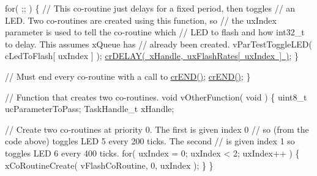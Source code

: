 \begin{DoxyPre}    for( ;; )
    \{
        // This co-routine just delays for a fixed period, then toggles
        // an LED.  Two co-routines are created using this function, so
        // the uxIndex parameter is used to tell the co-routine which
        // LED to flash and how int32\_t to delay.  This assumes xQueue has
        // already been created.
        vParTestToggleLED( cLedToFlash[ uxIndex ] );
        \mbox{\hyperlink{croutine_8h_a05a06feb11028f2d1d440ea335f562ba}{crDELAY( xHandle, uxFlashRates[ uxIndex ] )}};
    \}\end{DoxyPre}



\begin{DoxyPre}    // Must end every co-routine with a call to \mbox{\hyperlink{croutine_8h_ae6038cc976689b50000475ebfc4e2f23}{crEND()}};
    \mbox{\hyperlink{croutine_8h_ae6038cc976689b50000475ebfc4e2f23}{crEND()}};
\}\end{DoxyPre}



\begin{DoxyPre}// Function that creates two co-routines.
void vOtherFunction( void )
\{
uint8\_t ucParameterToPass;
TaskHandle\_t xHandle;\end{DoxyPre}



\begin{DoxyPre}    // Create two co-routines at priority 0.  The first is given index 0
    // so (from the code above) toggles LED 5 every 200 ticks.  The second
    // is given index 1 so toggles LED 6 every 400 ticks.
    for( uxIndex = 0; uxIndex < 2; uxIndex++ )
    \{
        xCoRoutineCreate( vFlashCoRoutine, 0, uxIndex );
    \}
\}
  \end{DoxyPre}
 